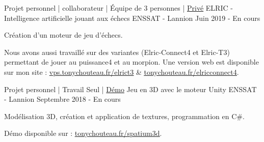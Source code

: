 

\begin{cventries}

  \cventry
    {Projet personnel | collaborateur | Équipe de 3 personnes | \href{}{\faGithubSquare\acvHeaderIconSep Privé}} %
    {ELRIC - Intelligence artificielle jouant aux échecs} %
    {ENSSAT - Lannion} %
    {Juin 2019 - En cours} %
    {
      \begin{cvitems} %
        \item {Création d'un moteur de jeu d'échecs.}
        \item {Nous avons aussi travaillé sur des variantes (Elric-Connect4 et Elric-T3) permettant de jouer au puissance4 et au morpion. Une version web est disponible sur mon site : \underline{\href{http://vps.tonychouteau.fr/elricT3_v2}{vps.tonychouteau.fr/elrict3}} \& \underline{\href{http://www.tonychouteau.fr/elricconnect4/}{tonychouteau.fr/elricconnect4}}.}
      \end{cvitems}
    }

  \cventry
    {Projet personnel | Travail Seul | \href{http://www.tonychouteau.fr/spatium3d/}{Démo}} %
    {Jeu en 3D avec le moteur Unity} %
    {ENSSAT - Lannion} %
    {Septembre 2018 - En cours} %
    {
      \begin{cvitems} %
       \item {Modélisation 3D, création et application de textures, programmation en C\#.}
       \item {Démo disponible sur : \underline{\href{http://www.tonychouteau.fr/spatium3d}{tonychouteau.fr/spatium3d}}.}
      \end{cvitems}
    }


\end{cventries}

